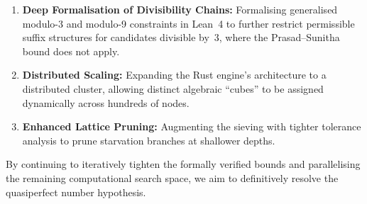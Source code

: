 \begin{enumerate}
  \item \textbf{Deep Formalisation of Divisibility Chains:}
    Formalising generalised modulo-3 and modulo-9 constraints in
    Lean~4 to further restrict permissible suffix structures for
    candidates divisible by~3, where the Prasad--Sunitha bound does
    not apply.

  \item \textbf{Distributed Scaling:}
    Expanding the Rust engine's architecture to a distributed cluster,
    allowing distinct algebraic ``cubes'' to be assigned dynamically
    across hundreds of nodes.

  \item \textbf{Enhanced Lattice Pruning:}
    Augmenting the sieving with tighter tolerance analysis to prune starvation branches at
    shallower depths.
\end{enumerate}

By continuing to iteratively tighten the formally verified bounds and
parallelising the remaining computational search space, we aim to
definitively resolve the quasiperfect number hypothesis.
